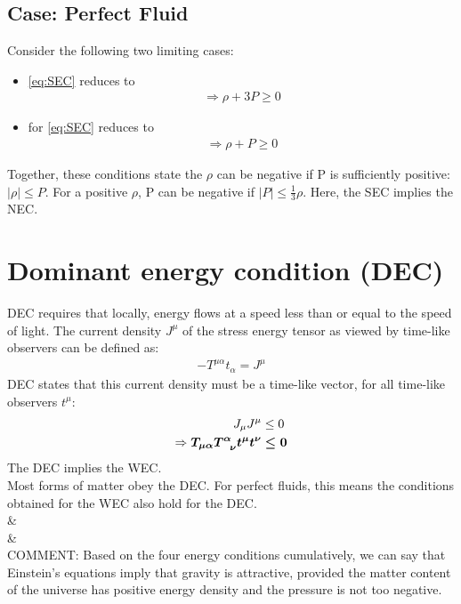 \documentclass[10pt]{article}
\begin{document}
            \subsection{Case: Perfect Fluid}
            	Consider the following two limiting cases:
            	\begin{itemize}
                    \item {} \eqref{eq:SEC} reduces to
                        \begin{align}
                	        \Rightarrow \rho + 3P \geq 0 
                	    \end{align}
                    \item {} for  \eqref{eq:SEC} reduces to
                        \begin{align}
                	        \Rightarrow \rho + P \geq 0 
                        \end{align}
               	\end{itemize}
               	Together, these conditions state the $\rho$ can be negative if P is sufficiently positive: $|\rho| \leq P$. 
               	For a positive $\rho$, P can be negative if $|P| \leq \frac{1}{3}\rho$. 
               	Here, the SEC implies the NEC. 
                
        	\section{Dominant energy condition (DEC)}\label{sec:DEC}
        	    DEC requires that locally, energy flows at a speed less than or equal to the speed of light. The current density $J^{\mu}$ of the stress energy tensor as viewed by time-like observers can be defined as:
        	    \begin{align}
        	        -T^{\mu\alpha}t_{\alpha} = J^{\mu}
        	    \end{align}
        	    DEC states that this current density must be a time-like vector, for all time-like observers $t^{\mu}$:
        	    \begin{align}
        	        J_{\mu}J^{\mu} &\leq 0 \notag \\
        	        \Rightarrow \boldsymbol{T_{\mu\alpha}T^{\alpha}_{\ \ \nu}t^{\mu}t^{\nu}} &\boldsymbol{\leq 0}
        	    \end{align}
        	    The DEC implies the WEC. \\
        	    Most forms of matter obey the DEC. For perfect fluids, this means the conditions obtained for the WEC also hold for the DEC. 
        	    \\ & \\ & \\
            COMMENT: Based on the four energy conditions cumulatively, we can say that Einstein's equations imply that gravity is attractive, provided the matter content of the universe has positive energy density and the pressure is not too negative. 
        	    
\end{document}
